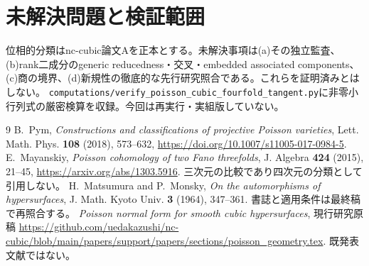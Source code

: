 \documentclass[11pt,a4paper]{ltjsarticle}
\begin{document}
\section{未解決問題と検証範囲}
位相的分類はnc-cubic論文Aを正本とする。未解決事項は(a)その独立監査、(b)rank二成分のgeneric reducedness・交叉・embedded associated components、(c)商の境界、(d)新規性の徹底的な先行研究照合である。これらを証明済みとはしない。
\texttt{computations/verify\_poisson\_cubic\_fourfold\_tangent.py}に非零小行列式の厳密検算を収録。今回は再実行・実組版していない。
\begin{thebibliography}{9}
 B.~Pym, \emph{Constructions and classifications of projective Poisson varieties}, Lett. Math. Phys. \textbf{108} (2018), 573--632, \url{https://doi.org/10.1007/s11005-017-0984-5}.
 E.~Mayanskiy, \emph{Poisson cohomology of two Fano threefolds}, J. Algebra \textbf{424} (2015), 21--45, \url{https://arxiv.org/abs/1303.5916}. 三次元の比較であり四次元の分類として引用しない。
 H.~Matsumura and P.~Monsky, \emph{On the automorphisms of hypersurfaces}, J. Math. Kyoto Univ. \textbf{3} (1964), 347--361. 書誌と適用条件は最終稿で再照合する。
 \emph{Poisson normal form for smooth cubic hypersurfaces}, 現行研究原稿 \url{https://github.com/uedakazushi/nc-cubic/blob/main/papers/support/papers/sections/poisson_geometry.tex}. 既発表文献ではない。
\end{thebibliography}
\end{document}
